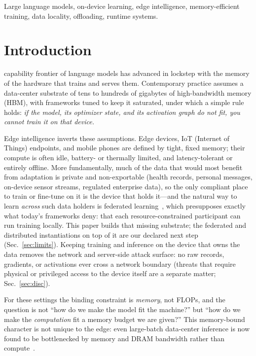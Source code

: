\documentclass[journal]{IEEEtran}
\begin{document}
\begin{IEEEkeywords}
Large language models, on-device learning, edge intelligence,
memory-efficient training, data locality, offloading, runtime systems.
\end{IEEEkeywords}

\section{Introduction}\label{sec:intro}
 capability frontier of language models has advanced in
lockstep with the memory of the hardware that trains and serves them.
Contemporary practice assumes a data-center substrate of tens to hundreds of
gigabytes of high-bandwidth memory (HBM), with frameworks tuned to keep it
saturated, under which a simple rule holds: \emph{if the model, its optimizer
state, and its activation graph do not fit, you cannot train it on that
device.}

Edge intelligence inverts these assumptions. Edge devices, IoT (Internet of Things) endpoints,
and mobile phones are defined by tight, fixed memory; their compute is often
idle, battery- or thermally limited, and latency-tolerant or entirely
offline. More fundamentally, much of the data that would most benefit from
adaptation is private and non-exportable (health records, personal messages,
on-device sensor streams, regulated enterprise data), so the only compliant
place to train or fine-tune on it is the device that holds it---and the
natural way to learn \emph{across} such data holders is federated
learning~\cite{mcmahan2017federated}, which presupposes exactly what today's
frameworks deny: that each resource-constrained participant can run training
locally. This paper builds that missing substrate; the federated and
distributed instantiations on top of it are our declared next step
(Sec.~\ref{sec:limits}). Keeping training and inference on the device that
owns the data removes the network and server-side attack surface: no raw
records, gradients, or activations ever cross a network boundary (threats
that require physical or privileged access to the device itself are a
separate matter; Sec.~\ref{sec:disc}).

For these settings the binding constraint is \emph{memory}, not FLOPs, and
the question is not ``how do we make the model fit the machine?'' but ``how
do we make the \emph{computation} fit a memory budget we are given?'' This
memory-bound character is not unique to the edge: even large-batch
data-center inference is now found to be bottlenecked by memory and DRAM
bandwidth rather than compute~\cite{tazi2025memorygap}.
\end{document}
